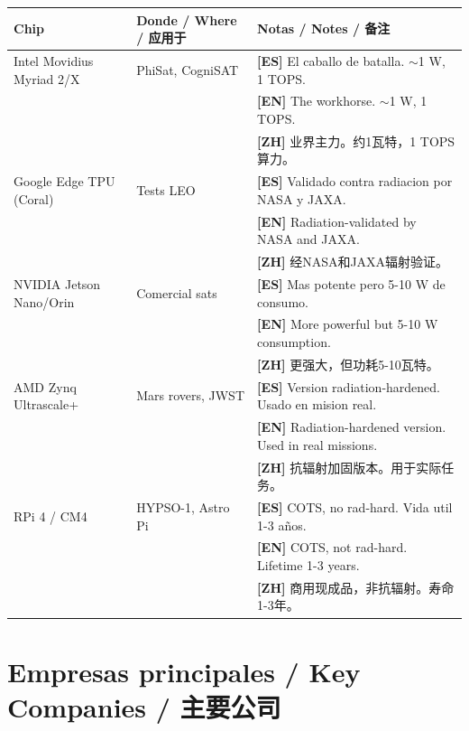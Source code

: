 \documentclass[11pt,a4paper]{report}
\begin{document}
\begin{center}
\small
\begin{longtable}{p{4cm}p{4.5cm}p{6.5cm}}
\toprule
\textbf{Chip} &
\textbf{Donde / Where / 应用于} &
\textbf{Notas / Notes / 备注} \\
\midrule
\endhead
Intel Movidius Myriad 2/X &
PhiSat, CogniSAT &
\textbf{[ES]} El caballo de batalla. $\sim$1 W, 1 TOPS.\\
&&\textbf{[EN]} The workhorse. $\sim$1 W, 1 TOPS.\\
&&\textbf{[ZH]} 业界主力。约1瓦特，1 TOPS算力。\\
\midrule
Google Edge TPU (Coral) &
Tests LEO &
\textbf{[ES]} Validado contra radiacion por NASA y JAXA.\\
&&\textbf{[EN]} Radiation-validated by NASA and JAXA.\\
&&\textbf{[ZH]} 经NASA和JAXA辐射验证。\\
\midrule
NVIDIA Jetson Nano/Orin &
Comercial sats &
\textbf{[ES]} Mas potente pero 5-10 W de consumo.\\
&&\textbf{[EN]} More powerful but 5-10 W consumption.\\
&&\textbf{[ZH]} 更强大，但功耗5-10瓦特。\\
\midrule
AMD Zynq Ultrascale+ &
Mars rovers, JWST &
\textbf{[ES]} Version radiation-hardened. Usado en mision real.\\
&&\textbf{[EN]} Radiation-hardened version. Used in real missions.\\
&&\textbf{[ZH]} 抗辐射加固版本。用于实际任务。\\
\midrule
RPi 4 / CM4 &
HYPSO-1, Astro Pi &
\textbf{[ES]} COTS, no rad-hard. Vida util 1-3 años.\\
&&\textbf{[EN]} COTS, not rad-hard. Lifetime 1-3 years.\\
&&\textbf{[ZH]} 商用现成品，非抗辐射。寿命1-3年。\\
\bottomrule
\end{longtable}
\end{center}

\chapter{Empresas principales / Key Companies / 主要公司}
\end{document}
